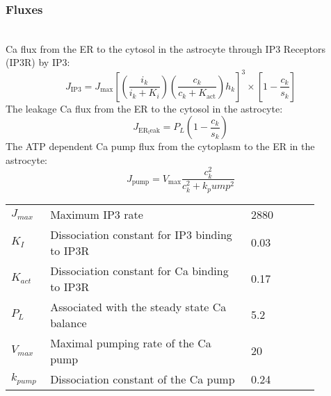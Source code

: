 \subsubsection{Fluxes}~\\
\gls{Ca} flux from the ER to the cytosol in the astrocyte through \gls{IP3} Receptors (\gls{IP3}R) by \gls{IP3}: 
\begin{equation} \label{eq:J_ip3}
J_{\mathrm{IP3}}=J_{\mathrm{max}}[(\frac{i_k}{i_k+K_i})(\frac{c_k}{c_k+K_{\mathrm{act}}})h_k]^3\times [1-\frac{c_k}{s_k}] 
\end{equation}
%
The leakage \gls{Ca}  flux from the \gls{ER} to the cytosol in the astrocyte:
\begin{equation} \label{eq:J_ER_leak}
J_{\mathrm{ER_leak}} = P_L(1-\frac{c_k}{s_k})
\end{equation}	
%
The ATP dependent \gls{Ca}  pump flux from the cytoplasm to the ER in the astrocyte:
\begin{equation} \label{eq:J_pump}
J_{\mathrm{pump}} = V_{\mathrm{max}}\frac{c_k^2}{c_k^2+k_pump^2}
\end{equation}
\begin{table}[h!]
	\centering
	\begin{tabular}{| p{0.09\linewidth} | >{\footnotesize} p{0.6\linewidth} | >{\footnotesize} p{0.17\linewidth} | >{\footnotesize} p{0.02\linewidth} |}
		\arrayrulecolor{lightgrey}\hline	
		$J_{max}$       & Maximum \gls{IP3} rate                                                & 2880 \uMps        & \cite{Farr2011} \\  
		$K_I$           & Dissociation constant for \gls{IP3} binding to \gls{IP3}R             & 0.03 \uM          & \cite{Farr2011} \\ 
		$K_{act}$       & Dissociation constant for \gls{Ca} binding to \gls{IP3}R              & 0.17 \uM          & \cite{Farr2011} \\ 
		$P_L$           & Associated with the steady state \gls{Ca} balance                     & 5.2 \uM           & \cite{Farr2011} \\ 
		$V_{max}$       & Maximal pumping rate of the \gls{Ca} pump                             & 20 \uMps          & \cite{Farr2011} \\ 
		$k_{pump}$      & Dissociation constant of the \gls{Ca} pump                            & 0.24 \uM          & \cite{Farr2011} \\ 
		\hline
	\end{tabular}
\end{table}

